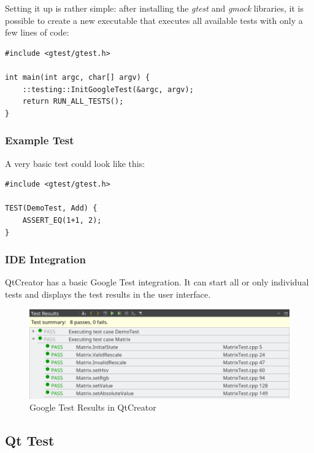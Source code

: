 \documentclass{scrreprt}
\begin{document}
Setting it up is rather simple: after installing the \textit{gtest} and \textit{gmock} libraries, it is possible to create a new executable that executes all available tests with only a few lines of code:

\bigskip
\begin{lstlisting}[title=tests-google/main.cpp]
#include <gtest/gtest.h>

int main(int argc, char[] argv) {
	::testing::InitGoogleTest(&argc, argv);
	return RUN_ALL_TESTS();
}
\end{lstlisting}
\bigskip

\subsubsection{Example Test}

A very basic test could look like this:

\bigskip
\begin{lstlisting}[title=tests-google/Demo.cpp]
#include <gtest/gtest.h>

TEST(DemoTest, Add) {
	ASSERT_EQ(1+1, 2);
}
\end{lstlisting}
\bigskip

\subsubsection{IDE Integration}

QtCreator has a basic Google Test integration. It can start all or only individual tests and displays the test results in the user interface.

\begin{figure}[h]
	\centering
	\includegraphics[width=1.0\textwidth]{img/qtcreator_test_results}
	\caption[QtCreator Google Test Results]{Google Test Results in QtCreator}
	\label{fig:qtcreator_test_results}
\end{figure}

\subsection{Qt Test}
\end{document}
